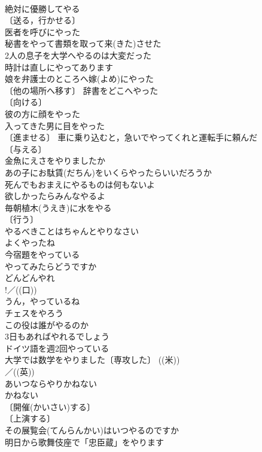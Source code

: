 \documentclass[8pt]{extreport}
\begin{document}
\begin{CJK}{UTF8}{min}
\\	絶対に優勝してやる 
\\	〔送る，行かせる〕
\\	医者を呼びにやった 
\\	秘書をやって書類を取って来(きた)させた 
\\	2人の息子を大学へやるのは大変だった 
\\	時計は直しにやってあります 
\\	娘を弁護士のところへ嫁(よめ)にやった 
\\	〔他の場所へ移す〕 辞書をどこへやった 
\\	〔向ける〕
\\	彼の方に顔をやった 
\\	入ってきた男に目をやった 
\\	〔進ませる〕 車に乗り込むと，急いでやってくれと運転手に頼んだ 
\\	〔与える〕
\\	金魚にえさをやりましたか 
\\	あの子にお駄賃(だちん)をいくらやったらいいだろうか 
\\	死んでもおまえにやるものは何もないよ 
\\	欲しかったらみんなやるよ 
\\	毎朝植木(うえき)に水をやる 
\\	〔行う〕
\\	やるべきことはちゃんとやりなさい 
\\	よくやったね 
\\	今宿題をやっている 
\\	やってみたらどうですか 
\\	どんどんやれ 
\\	!／((口)) 
\\	うん，やっているね 
\\	チェスをやろう 
\\	この役は誰がやるのか 
\\	3日もあればやれるでしょう 
\\	ドイツ語を週2回やっている 
\\	大学では数学をやりました〔専攻した〕 ((米)) 
\\	／((英)) 
\\	あいつならやりかねない 
\\	かねない　
\\	〔開催(かいさい)する〕
\\	〔上演する〕
\\	その展覧会(てんらんかい)はいつやるのですか 
\\	明日から歌舞伎座で「忠臣蔵」をやります 

\end{CJK}
\end{document}
